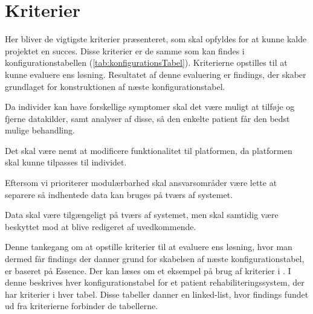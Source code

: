 \section{Kriterier}\label{firstsubseckriterier}
Her bliver de vigtigste kriterier præsenteret, som skal opfyldes for at kunne kalde projektet en succes.
Disse kriterier er de samme som kan findes i konfigurationstabellen (\cref{tab:konfigurationsTabel}).
Kriterierne opstilles til at kunne evaluere ens løsning.
Resultatet af denne evaluering er findings, der skaber grundlaget for konstruktionen af næste konfigurationstabel.



\begin{description}[style=nextline]
	\item[Modulær] 
	Da individer kan have forskellige symptomer skal det være muligt at tilføje og fjerne datakilder, samt analyser af disse, så den enkelte patient får den bedst mulige behandling.
	\item[Fleksibel]
	Det skal være nemt at modificere funktionalitet til platformen, da platformen skal kunne tilpasses til individet.
	\item[Kombinerbar] Eftersom vi prioriterer modulærbarhed skal ansvarsområder være lette at separere så indhentede data kan bruges på tværs af systemet.
	\item[Kommunikativ] Data skal være tilgængeligt på tværs af systemet, men skal samtidig være beskyttet mod at blive redigeret af uvedkommende.
\end{description}

Denne tankegang om at opstille kriterier til at evaluere ens løsning, hvor man dermed får findings der danner grund for skabelsen af næste konfigurationstabel, er baseret på Essence.
Der kan læses om et eksempel på brug af kriterier i \citet[Kapitel 2.2, 2.3, 2.4 og 2.5 side 16--21]{art:essence}.
I denne beskrives hver konfigurationstabel for et patient rehabiliteringssystem, der har kriterier i hver tabel.
Disse tabeller danner en linked-list, hvor findings fundet ud fra kriterierne forbinder de tabellerne.

